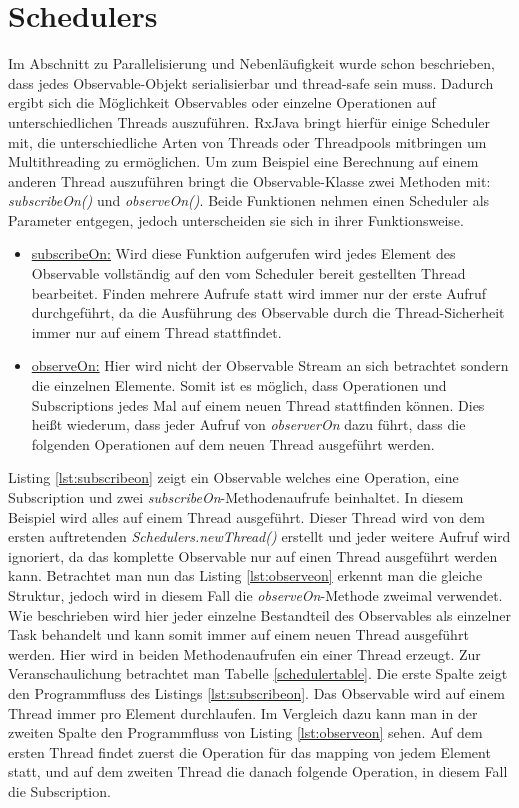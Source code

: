 \section{Schedulers}
Im Abschnitt zu Parallelisierung und Nebenläufigkeit wurde schon beschrieben, dass jedes Observable-Objekt serialisierbar und thread-safe sein muss. Dadurch ergibt sich die Möglichkeit Observables oder einzelne Operationen auf unterschiedlichen Threads auszuführen. RxJava bringt hierfür einige Scheduler mit, die unterschiedliche Arten von Threads oder Threadpools mitbringen um Multithreading zu ermöglichen. Um zum Beispiel eine Berechnung auf einem anderen Thread auszuführen bringt die Observable-Klasse zwei Methoden mit: \textit{subscribeOn()} und \textit{observeOn()}. Beide Funktionen nehmen einen Scheduler als Parameter entgegen, jedoch unterscheiden sie sich in ihrer Funktionsweise. 
\begin{itemize}
\item \underline{subscribeOn:} Wird diese Funktion aufgerufen wird jedes Element des Observable vollständig auf den vom Scheduler bereit gestellten Thread bearbeitet. Finden mehrere Aufrufe statt wird immer nur der erste Aufruf durchgeführt, da die Ausführung des Observable durch die Thread-Sicherheit immer nur auf einem Thread stattfindet. 
\item \underline{observeOn:} Hier wird nicht der Observable Stream an sich betrachtet sondern die einzelnen Elemente. Somit ist es möglich, dass Operationen und Subscriptions jedes Mal auf einem neuen Thread stattfinden können. Dies heißt wiederum, dass jeder Aufruf von \textit{observerOn} dazu führt, dass die folgenden Operationen auf dem neuen Thread ausgeführt werden.
\end{itemize}

Listing \ref{lst:subscribeon} zeigt ein Observable welches eine Operation, eine Subscription und zwei \textit{subscribeOn}-Methodenaufrufe beinhaltet. In diesem Beispiel wird alles auf einem Thread ausgeführt. Dieser Thread wird von dem ersten auftretenden \textit{Schedulers.newThread()} erstellt und jeder weitere Aufruf wird ignoriert, da das komplette Observable nur auf einen Thread ausgeführt werden kann. Betrachtet man nun das Listing \ref{lst:observeon} erkennt man die gleiche Struktur, jedoch wird in diesem Fall die \textit{observeOn}-Methode zweimal verwendet. Wie beschrieben wird hier jeder einzelne Bestandteil des Observables als einzelner Task behandelt und kann somit immer auf einem neuen Thread ausgeführt werden. Hier wird in beiden Methodenaufrufen ein einer Thread erzeugt. Zur Veranschaulichung betrachtet man Tabelle \ref{schedulertable}. Die erste Spalte zeigt den Programmfluss des Listings \ref{lst:subscribeon}. Das Observable wird auf einem Thread immer pro Element durchlaufen. Im Vergleich dazu kann man in der zweiten Spalte den Programmfluss von Listing \ref{lst:observeon} sehen. Auf dem ersten Thread findet zuerst die Operation für das mapping von jedem Element statt, und auf dem zweiten Thread die danach folgende Operation, in diesem Fall die Subscription.
